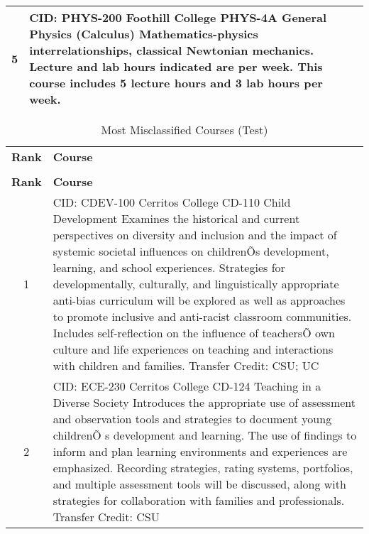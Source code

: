 \begin{longtable}{ >{\baselineskip=12pt}c >{\baselineskip=12pt}p{} }
\midrule
5 & CID: PHYS-200 \newline
Foothill College \newline
PHYS-4A General Physics (Calculus) \newline
Mathematics-physics interrelationships, classical Newtonian mechanics. Lecture and lab hours indicated are per week. This course includes 5 lecture hours and 3 lab hours per week.\\
\bottomrule
\end{longtable}

\begin{longtable}{ >{\baselineskip=12pt}c >{\baselineskip=12pt}p{} }
\captionsetup{skip=5pt}
\caption{Most Misclassified Courses (Test)}\label{tab:fp_overlap_test}\\
\toprule
\textbf{\textbf{Rank}} & \textbf{\textbf{Course}} \\
\midrule
\endfirsthead
\caption[]{Most Misclassified Courses (Test)}\\
\toprule
\textbf{\textbf{Rank}} & \textbf{\textbf{Course}} \\
\midrule
\endhead
1 & CID: CDEV-100 \newline
Cerritos College \newline
CD-110 Child Development \newline
Examines the historical and current perspectives on diversity and inclusion and the impact of systemic societal influences on childrenÕs development, learning, and school experiences. Strategies for developmentally, culturally, and linguistically appropriate anti-bias curriculum will be explored as well as approaches to promote inclusive and anti-racist classroom communities. Includes self-reflection on the influence of teachersÕ own culture and life experiences on teaching and interactions with children and families.
Transfer Credit: CSU; UC\\
\midrule
2 & CID: ECE-230 \newline
Cerritos College \newline
CD-124 Teaching in a Diverse Society \newline
Introduces the appropriate use of assessment and observation tools and strategies to document young childrenÕ
s development and learning. The use of findings to inform and plan learning environments and experiences are
emphasized. Recording strategies, rating systems, portfolios, and multiple assessment tools will be
discussed, along with strategies for collaboration with families and professionals. 
Transfer Credit: CSU\\

\end{longtable}

